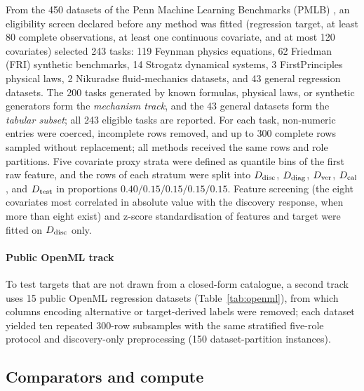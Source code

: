 From the 450 datasets of the Penn Machine Learning Benchmarks (PMLB) \citep{olson2017pmlb}, an eligibility screen declared before any method was fitted (regression target, at least 80 complete observations, at least one continuous covariate, and at most 120 covariates) selected 243 tasks: 119 Feynman physics equations, 62 Friedman (FRI) synthetic benchmarks, 14 Strogatz dynamical systems, 3 FirstPrinciples physical laws, 2 Nikuradse fluid-mechanics datasets, and 43 general regression datasets. The 200 tasks generated by known formulas, physical laws, or synthetic generators form the \emph{mechanism track}, and the 43 general datasets form the \emph{tabular subset}; all 243 eligible tasks are reported. For each task, non-numeric entries were coerced, incomplete rows removed, and up to 300 complete rows sampled without replacement; all methods received the same rows and role partitions. Five covariate proxy strata were defined as quantile bins of the first raw feature, and the rows of each stratum were split into \(D_{\rm disc}\), \(D_{\rm diag}\), \(D_{\rm ver}\), \(D_{\rm cal}\), and \(D_{\rm test}\) in proportions \(0.40/0.15/0.15/0.15/0.15\). Feature screening (the eight covariates most correlated in absolute value with the discovery response, when more than eight exist) and z-score standardisation of features and target were fitted on \(D_{\rm disc}\) only.

\paragraph{Public OpenML track} To test targets that are not drawn from a closed-form catalogue, a second track uses 15 public OpenML regression datasets \citep{vanschoren2013openml} (Table~\ref{tab:openml}), from which columns encoding alternative or target-derived labels were removed; each dataset yielded ten repeated 300-row subsamples with the same stratified five-role protocol and discovery-only preprocessing (150 dataset-partition instances).

\subsection{Comparators and compute}\label{sec:comparators}

